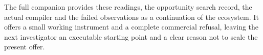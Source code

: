 The full companion provides these readings, the opportunity search record, the actual compiler and the failed observations as a continuation of the ecosystem. It offers a small working instrument and a complete commercial refusal, leaving the next investigator an executable starting point and a clear reason not to scale the present offer.
